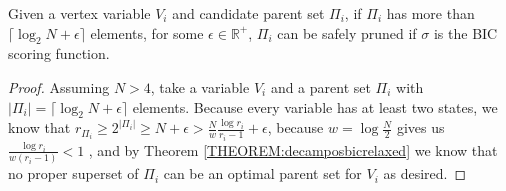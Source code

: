 \documentclass[letterpaper]{article}
\newcommand{\vertex}[1]{V_{#1}}
\newcommand{\ceil}[1]{\lceil #1 \rceil}
\newenvironment{customcor}[1]
  {\renewcommand\theinnercustomcor{#1}\innercustomcor}
  {\endinnercustomthm}
\begin{document}



\begin{customcor}{4}
	Given a vertex variable $\vertex{i}$ and candidate parent set 
	$\Pi_i$, if $\Pi_i$ has more than $\ceil{\log_2 N + \epsilon}$ elements, for some $\epsilon \in \mathbb{R}^+$, $\Pi_i$ can be safely pruned if $\sigma$ is the BIC scoring function.
\end{customcor}


	\begin{proof}
	Assuming $N>4$, take a variable $V_i$ and a parent set $\Pi_i$
with $|\Pi_i| = \ceil{\log_2 N + \epsilon}$ elements.  Because every variable has at least two states, we know that $r_{\Pi_i} \geq 2^{|\Pi_i|}  \geq N +\epsilon > \frac{N}{w}\frac{\log r_i}{r_i -1}+ \epsilon$, because $w =\log \frac{N}{2}$ gives us $\frac{\log r_i}{w(r_i -1)} < 1$ , and by Theorem \ref{THEOREM:decamposbicrelaxed} we know that no proper superset of $\Pi_i$ can be an optimal parent set for $\vertex{i}$ as desired.
	\end{proof} 
\end{document}
